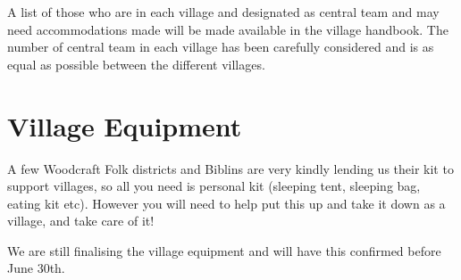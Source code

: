 \documentclass[a4paper, 11pt]{report}
\newcommand{\nl}{\newline}
\begin{document}
A list of those who are in each village and designated as central team and may need accommodations made will be made available in the village handbook. The number of central team in each village has been carefully considered and is as equal as possible between the different villages.

\section{Village Equipment}
A few Woodcraft Folk districts and Biblins are very kindly lending us their kit to support villages, so all you need is personal kit (sleeping tent, sleeping bag, eating kit etc). However you will need to help put this up and take it down as a village, and take care of it!\nl

We are still finalising the village equipment and will have this confirmed before June 30th. 
\end{document}
